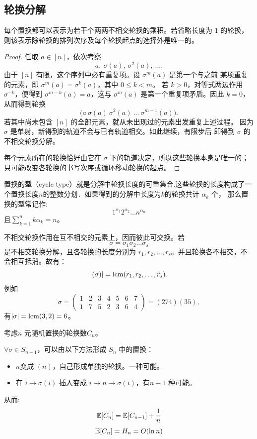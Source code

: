 \subsection{轮换分解}
\begin{theorem}[置换的不相交轮换分解]
    每个置换都可以表示为若干个两两不相交轮换的乘积。若省略长度为 \(1\) 的轮换，
    则该表示除轮换的排列次序及每个轮换起点的选择外是唯一的。
\end{theorem}
\begin{proof}
    任取 \(a\in[n]\)，依次考察
    \[
        a,\ \sigma(a),\ \sigma^2(a),\ \dots.
    \]
    由于 \([n]\) 有限，这个序列中必有重复项。设 \(\sigma^m(a)\) 是第一个与之前
    某项重复的元素，即 \(\sigma^m(a)=\sigma^k(a)\)，其中 \(0\leq k<m\)。
    若 \(k>0\)，对等式两边作用 \(\sigma^{-k}\)，便得到
    \(\sigma^{m-k}(a)=a\)，这与 \(\sigma^m(a)\) 是第一个重复项矛盾。因此 \(k=0\)，
    从而得到轮换
    \[
        \bigl(a\ \sigma(a)\ \sigma^2(a)\ \dots\ \sigma^{m-1}(a)\bigr).
    \]
    若其中尚未包含 \([n]\) 的全部元素，就从未出现过的元素出发重复上述过程。
    因为 \(\sigma\) 是单射，新得到的轨道不会与已有轨道相交。如此继续，有限步后
    即得到 \(\sigma\) 的不相交轮换分解。

    每个元素所在的轮换恰好由它在 \(\sigma\) 下的轨道决定，所以这些轮换本身是唯一的；
    只可能改变各轮换的书写次序或循环移动轮换的起点。
\end{proof}

置换的\textbf{型}（cycle type）就是分解中轮换长度的可重集合.这些轮换的长度构成了一个置换长度\(n\)的整数分划．如果得到的分解中长度为\(k\)的轮换共计 \(\alpha_{k}\) 个，
那么置换的型常记作:\[
    1^{\alpha_{1}}2^{\alpha_{2}}\dots n^{\alpha_{n}}
\]
且\(\sum_{k=1}^{n} k\alpha_{k}=n\)。

不相交轮换作用在互不相交的元素上，因而彼此可交换。若
\[
    \sigma=\sigma_1\sigma_2\dots\sigma_s
\]
是不相交轮换分解，且各轮换的长度分别为 \(r_1,r_2,\dots,r_s\)。并且轮换各不相交，不会相互抵消。故有：
\[
    \left|(\sigma)\right|=\operatorname{lcm}(r_1,r_2,\dots,r_s).
\]
例如
\[
    \sigma=
    \begin{pmatrix}
        1&2&3&4&5&6&7\\
        1&7&5&2&3&6&4
    \end{pmatrix}
    =(274)(35),
\]
有\(\left|\sigma\right|=\operatorname{lcm}(3,2)=6\)。

考虑\(n\) 元随机置换的轮换数\(C_{n}\)。

\(\forall \sigma \in S_{n-1}\)，可以由以下方法形成 \(S_{n}\) 中的置换：
\begin{itemize}
    \item \(n\)变成 \((n)\)，自己形成单独的轮换。一种可能。
    \item 在 \(i\to \sigma(i)\) 插入变成 \(i\to n\to \sigma(i)\)，有\(n-1\) 种可能。
\end{itemize}
从而:\[
    \mathbb{E}[C_{n}] = \mathbb{E}[C_{n-1}] + \frac{1}{n}
\]
\[
    \mathbb{E}[C_{n}] = H_{n} = O(\ln n)
\]

